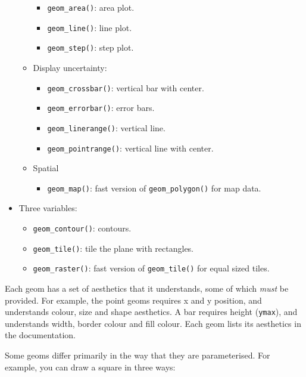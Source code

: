 \begin{itemize}
\begin{itemize}
    \begin{itemize}
    \tightlist
    \item
      \texttt{geom\_area()}: area plot.
    \item
      \texttt{geom\_line()}: line plot.
    \item
      \texttt{geom\_step()}: step plot.
    \end{itemize}
  \item
    Display uncertainty:

    \begin{itemize}
    \tightlist
    \item
      \texttt{geom\_crossbar()}: vertical bar with center.
    \item
      \texttt{geom\_errorbar()}: error bars.
    \item
      \texttt{geom\_linerange()}: vertical line.
    \item
      \texttt{geom\_pointrange()}: vertical line with center.
    \end{itemize}
  \item
    Spatial

    \begin{itemize}
    \tightlist
    \item
      \texttt{geom\_map()}: fast version of \texttt{geom\_polygon()} for
      map data.
    \end{itemize}
  \end{itemize}
\item
  Three variables:

  \begin{itemize}
  \tightlist
  \item
    \texttt{geom\_contour()}: contours.
  \item
    \texttt{geom\_tile()}: tile the plane with rectangles.
  \item
    \texttt{geom\_raster()}: fast version of \texttt{geom\_tile()} for
    equal sized tiles.
  \end{itemize}
\end{itemize}

Each geom has a set of aesthetics that it understands, some of which
\emph{must} be provided. For example, the point geoms requires x and y
position, and understands colour, size and shape aesthetics. A bar
requires height (\texttt{ymax}), and understands width, border colour
and fill colour. Each geom lists its aesthetics in the documentation.

Some geoms differ primarily in the way that they are parameterised. For
example, you can draw a square in three ways:

